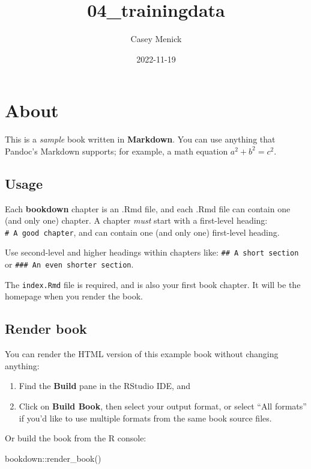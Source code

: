 \documentclass[
]{book}
\title{04\_trainingdata}
\author{Casey Menick}
\date{2022-11-19}
\newenvironment{Shaded}{\begin{snugshade}}{\end{snugshade}}
\newcommand{\FunctionTok}[1]{\textcolor[rgb]{0.00,0.00,0.00}{#1}}
\newcommand{\NormalTok}[1]{#1}
\newcommand{\SpecialCharTok}[1]{\textcolor[rgb]{0.00,0.00,0.00}{#1}}
\begin{document}
\maketitle

{
\setcounter{tocdepth}{1}
\tableofcontents
}
\hypertarget{about}{%
\chapter{About}\label{about}}

This is a \emph{sample} book written in \textbf{Markdown}. You can use anything that Pandoc's Markdown supports; for example, a math equation \(a^2 + b^2 = c^2\).

\hypertarget{usage}{%
\section{Usage}\label{usage}}

Each \textbf{bookdown} chapter is an .Rmd file, and each .Rmd file can contain one (and only one) chapter. A chapter \emph{must} start with a first-level heading: \texttt{\#\ A\ good\ chapter}, and can contain one (and only one) first-level heading.

Use second-level and higher headings within chapters like: \texttt{\#\#\ A\ short\ section} or \texttt{\#\#\#\ An\ even\ shorter\ section}.

The \texttt{index.Rmd} file is required, and is also your first book chapter. It will be the homepage when you render the book.

\hypertarget{render-book}{%
\section{Render book}\label{render-book}}

You can render the HTML version of this example book without changing anything:

\begin{enumerate}
\def\labelenumi{\arabic{enumi}.}
\item
  Find the \textbf{Build} pane in the RStudio IDE, and
\item
  Click on \textbf{Build Book}, then select your output format, or select ``All formats'' if you'd like to use multiple formats from the same book source files.
\end{enumerate}

Or build the book from the R console:

\begin{Shaded}
\begin{Highlighting}[]
\NormalTok{bookdown}\SpecialCharTok{::}\FunctionTok{render\_book}\NormalTok{()}
\end{Highlighting}
\end{Shaded}
\end{document}
